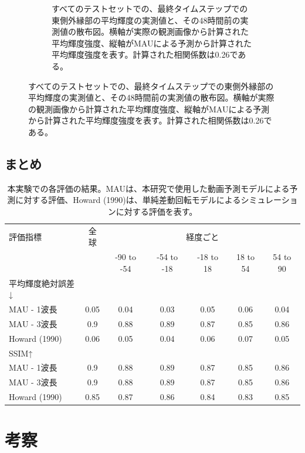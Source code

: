 \begin{figure}[htbp]
\begin{subfigure}[b]{0.55\textwidth}
            \caption{すべてのテストセットでの、最終タイムステップでの東側外縁部の平均輝度の実測値と、その48時間前の実測値の散布図。横軸が実際の観測画像から計算された平均輝度強度、縦軸がMAUによる予測から計算された平均輝度強度を表す。計算された相関係数は0.26である。}
          \end{subfigure}
          \label{fig:exp2_limb_scatter}
        \end{figure}
        
    \subsection{まとめ}
      \begin{table}[htbp]
        \centering
        \caption{本実験での各評価の結果。MAUは、本研究で使用した動画予測モデルによる予測に対する評価、Howard (1990)は、単純差動回転モデルによるシミュレーションに対する評価を表す。}
        \begin{tabular}{lcccccc}
        \hline
        評価指標 & 全球 & \multicolumn{5}{c}{経度ごと} \\
        \cline{3-7}
         &  & -90 to -54 & -54 to -18 & -18 to 18 & 18 to 54 & 54 to 90 \\
        \hline\hline
        平均輝度絶対誤差↓ & & & & & & \\
        \quad MAU - 1波長 & 0.05 & 0.04 & 0.03 & 0.05 & 0.06 & 0.04 \\
        \quad MAU - 3波長 & 0.9 & 0.88 & 0.89 & 0.87 & 0.85 & 0.86 \\
        \quad Howard (1990) & 0.06 & 0.05 & 0.04 & 0.06 & 0.07 & 0.05 \\
        \hline
        SSIM↑ & & & & & & \\
        \quad MAU - 1波長 & 0.9 & 0.88 & 0.89 & 0.87 & 0.85 & 0.86 \\
        \quad MAU - 3波長 & 0.9 & 0.88 & 0.89 & 0.87 & 0.85 & 0.86 \\
        \quad Howard (1990) & 0.85 & 0.87 & 0.86 & 0.84 & 0.83 & 0.85 \\
        \hline
        \end{tabular}
        \label{tab:exp2_result}
      \end{table}


  \section{考察}
